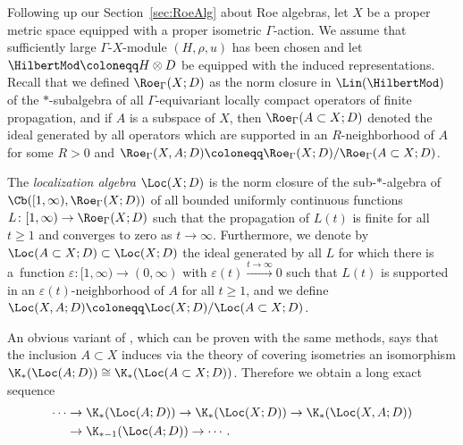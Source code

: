 Following up our Section~\ref{sec:RoeAlg} about Roe algebras, let $X$ be a proper metric space equipped with a proper isometric $\Gamma$-action. We assume that sufficiently large $\Gamma$-$X$-module $(H,\rho,u)$ has been chosen and let $\HilbertMod\coloneqq H\otimes D$ be equipped with the induced representations. Recall that we defined $\Roe_\Gamma(X;D)$ as the norm closure in $\Lin(\HilbertMod)$ of the $*$-subalgebra of all $\Gamma$-equivariant locally compact operators of finite propagation, and if $A$ is a subspace of $X$, then $\Roe_\Gamma(A\subset X;D)$ denoted the ideal generated by all operators which are supported in an $R$-neighborhood of $A$ for some $R>0$ and $\Roe_\Gamma(X,A;D)\coloneqq \Roe_\Gamma(X;D)/\Roe_\Gamma(A\subset X;D)$.


\begin{defn}
The \emph{localization algebra} $\Loc(X;D)$ is the norm closure of the sub-$*$-algebra of $\Cb([1,\infty),\Roe_\Gamma(X;D))$ of all bounded uniformly continuous functions $L\colon[1,\infty)\to\Roe_\Gamma(X;D)$ such that the propagation of $L(t)$ is finite for all $t\geq 1$ and converges to zero as $t\to\infty$. Furthermore, we denote by $\Loc(A\subset X;D)\subset \Loc(X;D)$ the ideal generated by all $L$ for which there is a~function $\varepsilon\colon[1,\infty)\to(0,\infty)$ with $\varepsilon(t)\xrightarrow{t\to\infty}0$ such that $L(t)$ is supported in an $\varepsilon(t)$-neighborhood of $A$ for all $t\geq 1$, and we define $\Loc(X,A;D)\coloneqq \Loc(X;D)/\Loc(A\subset X;D)$.
\end{defn}

An obvious variant of \cite[Lemma~6.3.6]{WillettYuHigherIndexTheory}, which can be proven with the same methods, says that the inclusion $A\subset X$ induces via the theory of covering isometries an isomorphism $\K_*(\Loc(A;D))\cong\K_*(\Loc(A\subset X;D))$. Therefore we obtain a long exact sequence
\begin{align}
\cdots&\to\K_*(\Loc(A;D))\to \K_*(\Loc(X;D))\to \K_*(\Loc(X,A;D))\nonumber
\\&\to \K_{*-1}(\Loc(A;D))\to\cdots.\label{eq:localizationLES}
\end{align}


